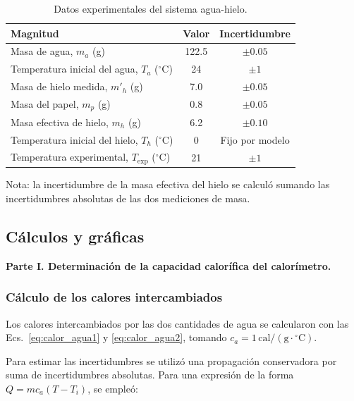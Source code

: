 \begin{table}[H]
    \centering
    \caption{Datos experimentales del sistema agua-hielo.}
    \label{tab:datos_hielo}
    \begin{tabular}{lcc}
        \toprule
        Magnitud & Valor & Incertidumbre \\
        \midrule
        Masa de agua, $m_a$ (g) & 122.5 & $\pm 0.05$ \\
        Temperatura inicial del agua, $T_a$ ($^\circ$C) & 24 & $\pm 1$ \\
        Masa de hielo medida, $m'_h$ (g) & 7.0 & $\pm 0.05$ \\
        Masa del papel, $m_p$ (g) & 0.8 & $\pm 0.05$ \\
        Masa efectiva de hielo, $m_h$ (g) & 6.2 & $\pm 0.10$ \\
        Temperatura inicial del hielo, $T_h$ ($^\circ$C) & 0 & Fijo por modelo \\
        Temperatura experimental, $T_{\mathrm{exp}}$ ($^\circ$C) & 21 & $\pm 1$ \\
        \bottomrule
    \end{tabular}

    \vspace{2mm}
    \footnotesize
    Nota: la incertidumbre de la masa efectiva del hielo se calculó sumando las incertidumbres absolutas de las dos mediciones de masa.
\end{table}


\subsection{Cálculos y gráficas}
\label{subsec:calculos_graficas}

\textbf{Parte I. Determinación de la capacidad calorífica del calorímetro.}

\subsubsection{Cálculo de los calores intercambiados}

Los calores intercambiados por las dos cantidades de agua se calcularon con las Ecs.~\eqref{eq:calor_agua1} y \eqref{eq:calor_agua2}, tomando $c_a=1\,\mathrm{cal}/(\mathrm{g}\cdot{}^{\circ}\mathrm{C})$.

Para estimar las incertidumbres se utilizó una propagación conservadora por suma de incertidumbres absolutas. Para una expresión de la forma $Q=mc_a(T-T_i)$, se empleó:

